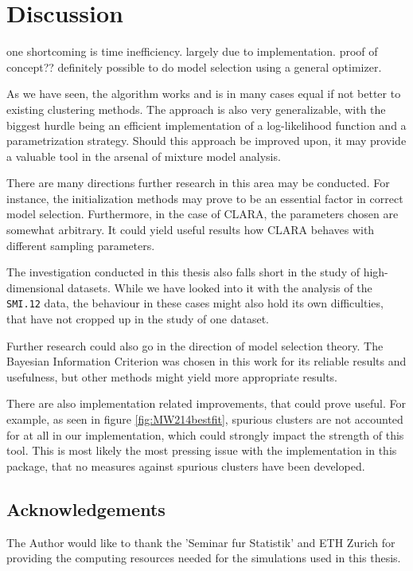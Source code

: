 \chapter{Discussion}



one shortcoming is time inefficiency. largely due to implementation.
proof of concept??
definitely possible to do model selection using a general optimizer.

As we have seen, the algorithm works and is in many cases equal if not better 
to existing clustering methods. The approach is also very generalizable, with 
the biggest hurdle being an efficient implementation of a log-likelihood 
function and a parametrization strategy.
Should this approach be improved upon, it may provide a valuable tool in the
arsenal of mixture model analysis.

There are many directions further research in this area may be conducted. For 
instance, the initialization methods may prove to be an essential factor in 
correct model selection. Furthermore, in the case of CLARA, the parameters 
chosen are somewhat arbitrary. It could yield useful results how CLARA behaves 
with different sampling parameters.

The investigation conducted in this thesis also falls short in the study of 
high-dimensional datasets. While we have looked into it with the analysis of 
the {\tt SMI.12} data, the behaviour in these cases might also hold its own
difficulties, that have not cropped up in the study of one dataset.

Further research could also go in the direction of model selection theory. The 
Bayesian Information Criterion was chosen in this work for its reliable results
and usefulness, but other methods might yield more appropriate results.

There are also implementation related improvements, that could prove useful.
For example, as seen in figure \ref{fig:MW214bestfit}, spurious clusters are 
not accounted for at all in our implementation, which could strongly impact the
strength of this tool. This is most likely the most pressing issue with the 
implementation in this package, that no measures against spurious clusters
have been developed.


\section{Acknowledgements}

The Author would like to thank the 'Seminar fur Statistik' and ETH Zurich 
for providing the computing resources needed for the simulations used in this
thesis. 

